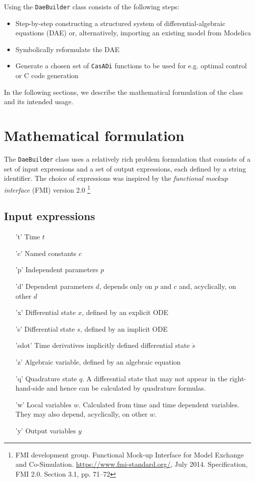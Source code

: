 \documentclass[a4paper,12pt]{book}
\newcommand{\CasADi}{\texttt{CasADi}\xspace}
\begin{document}
Using the \texttt{DaeBuilder} class consists of the following steps:
\begin{itemize}
  \item Step-by-step constructing a structured system of differential-algebraic
  equations (DAE) or, alternatively, importing an existing model from Modelica
  \item Symbolically reformulate the DAE
  \item Generate a chosen set of \CasADi functions to be used for e.g. optimal
  control or C code generation
\end{itemize}

In the following sections, we describe the mathematical formulation of the class
and its intended usage.

\section{Mathematical formulation} \label{sec:daebuilder_io}
The \texttt{DaeBuilder} class uses a relatively rich problem formulation that
consists of a set of input expressions and a set of output expressions, each
defined by a string identifier. The choice of expressions was inspired by the
\emph{functional mockup interface} (FMI) version 2.0
\footnote{FMI development group. Functional Mock-up Interface for Model Exchange and Co-Simulation. \url{https://www.fmi-standard.org/}, July 2014. Specification, FMI 2.0. Section 3.1, pp. 71–72}

\subsection*{Input expressions}
\begin{enumerate}
  \item['t'] Time $t$
  \item['c'] Named constants $c$
  \item['p'] Independent parameters $p$
  \item['d'] Dependent parameters $d$, depends only on $p$ and $c$ and,
  acyclically, on other $d$
  \item['x'] Differential state $x$, defined by an explicit ODE
  \item['s'] Differential state $s$, defined by an implicit ODE
  \item['sdot'] Time derivatives implicitly defined differential state $\dot{s}$
  \item['z'] Algebraic variable, defined by an algebraic equation
  \item['q'] Quadrature state $q$. A differential state that may not appear in
  the right-hand-side and hence can be calculated by quadrature formulas.
  \item['w'] Local variables $w$. Calculated from time and time dependent
  variables. They may also depend, acyclically, on other $w$.
  \item['y'] Output variables $y$
\end{enumerate}
\end{document}
